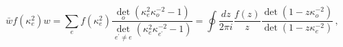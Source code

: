 \begin{equation}
\bar{w}f\left( \kappa _{e}^{2}\right) w=\sum_{e}f\left( \kappa
_{e}^{2}\right) \frac{\det_{o}\left( \kappa _{e}^{2}\kappa
_{o}^{-2}-1\right) }{\det_{e^{\prime }\neq e}\left( \kappa _{e}^{2}\kappa
_{e^{\prime }}^{-2}-1\right) }=\oint \frac{dz}{2\pi i}\frac{f\left(
z\right) }{z}\frac{\det \left( 1-z\kappa _{o}^{-2}\right) }{\det \left(
1-z\kappa _{e}^{-2}\right) }\,,
\end{equation}

